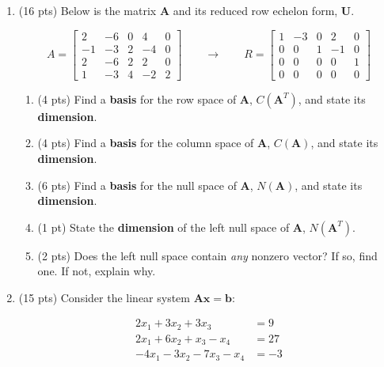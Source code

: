 \documentclass[11pt]{amsart}
\newcommand{\bb}{\mathbf{b}}
\newcommand{\bx}{\mathbf{x}}
\newcommand{\bA}{\mathbf{A}}
\newcommand{\bU}{\mathbf{U}}
\begin{document}
\begin{enumerate}
\item (16 pts) Below is the matrix $\bA$ and its reduced row echelon form, $\bU.$

 $$A = \begin{bmatrix} 2 & -6 & 0 & 4 & 0 \\ -1 & -3 & 2 & -4 & 0 \\ 2 & -6 & 2 & 2 & 0 \\ 1& -3& 4& -2 & 2 \end{bmatrix}
      \qquad \longrightarrow \qquad
      R = \begin{bmatrix} 1 & -3 & 0 & 2 & 0 \\ 0 & 0 & 1 & -1 & 0 \\ 0 & 0 & 0 & 0 & 1 \\ 0& 0& 0& 0& 0 \end{bmatrix}$$
      \begin{enumerate}
      \item (4 pts) Find a \textbf{basis} for the row space of $\bA$, $C(\bA^T)$, and state its \textbf{dimension}.
      \vfill
      \vfill
      \item (4 pts) Find a \textbf{basis} for the column space of $\bA$, $C(\bA)$, and state its \textbf{dimension}.
      \vfill
      \vfill
      \item (6 pts) Find a \textbf{basis} for the null space of $\bA$, $N(\bA)$, and state its \textbf{dimension}.
      \vfill
      \vfill
      \item (1 pt) State the \textbf{dimension} of the left null space of $\bA$, $N(\bA^T).$
      \vfill
      \item (2 pts) Does the left null space contain \emph{any} nonzero vector? If so, find one. If not, explain why.
      \vfill
      \end{enumerate}
 \newpage
 \item (15 pts) Consider the linear system $\bA \bx = \bb:$
 
 \begin{align*}
2x_1 + 3 x_2 +3x_3 \qquad &= 9 \\
2 x_1 +6 x_2 +  x_3 -x_4 &= 27 \\
-4 x_1 - 3 x_2 -7  x_3 -x_4 &= -3
\end{align*}


\end{enumerate}
\end{document}
